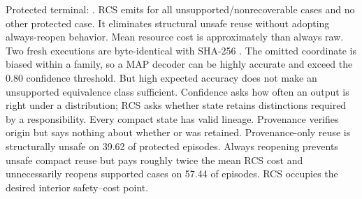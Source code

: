 \markdownRendererDocumentBegin
\markdownRendererSectionBegin
{}\markdownRendererInterblockSeparator
{}Protected terminal: .\markdownRendererInterblockSeparator
{}\markdownRendererInterblockSeparator
{}RCS emits  for all  unsupported/nonrecoverable cases and no other protected case. It eliminates structural unsafe reuse without adopting always-reopen behavior. Mean resource cost is approximately  than always raw. Two fresh executions are byte-identical with SHA-256 .\markdownRendererInterblockSeparator
{}\markdownRendererSectionBegin
{}\markdownRendererInterblockSeparator
{}The omitted coordinate is biased within a family, so a MAP decoder can be highly accurate and exceed the 0.80 confidence threshold. But high expected accuracy does not make an unsupported equivalence class sufficient. Confidence asks how often an output is right under a distribution; RCS asks whether state retains distinctions required by a responsibility.\markdownRendererInterblockSeparator
{}
\markdownRendererSectionEnd \markdownRendererSectionBegin
{}\markdownRendererInterblockSeparator
{}Every compact state has valid lineage. Provenance verifies origin but says nothing about whether  or  was retained. Provenance-only reuse is structurally unsafe on 39.62\markdownRendererPercentSign{} of protected episodes.\markdownRendererInterblockSeparator
{}
\markdownRendererSectionEnd \markdownRendererSectionBegin
{}\markdownRendererInterblockSeparator
{}Always reopening prevents unsafe compact reuse but pays roughly twice the mean RCS cost and unnecessarily reopens supported cases on 57.44\markdownRendererPercentSign{} of episodes. RCS occupies the desired interior safety–cost point.
\markdownRendererSectionEnd 
\markdownRendererSectionEnd \markdownRendererDocumentEnd